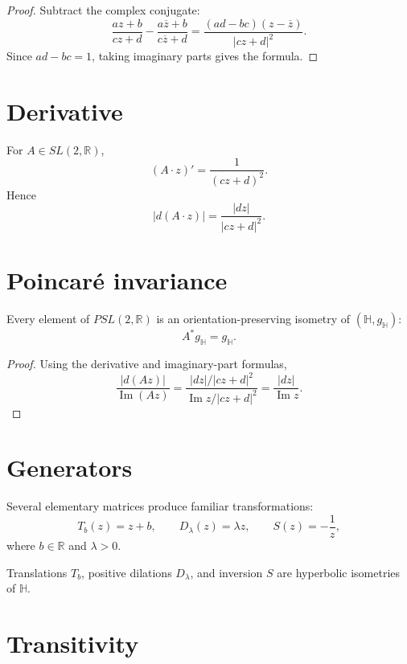 \begin{proof}
Subtract the complex conjugate:
\[
\frac{az+b}{cz+d}
-
\frac{a\overline z+b}{c\overline z+d}
=
\frac{(ad-bc)(z-\overline z)}
{|cz+d|^2}.
\]
Since \(ad-bc=1\), taking imaginary parts gives the formula.
\end{proof}

\section{Derivative}

\begin{proposition}\label{prop:vii33-derivative}
For \(A\in SL(2,\mathbb R)\),
\[
(A\cdot z)'
=
\frac1{(cz+d)^2}.
\]
Hence
\[
|d(A\cdot z)|
=
\frac{|dz|}{|cz+d|^2}.
\]
\end{proposition}

\section{Poincaré invariance}

\begin{theorem}\label{thm:vii33-metric-invariance}
Every element of \(PSL(2,\mathbb R)\) is an orientation-preserving isometry of
\((\mathbb H,g_{\mathbb H})\):
\[
A^*g_{\mathbb H}=g_{\mathbb H}.
\]
\end{theorem}

\begin{proof}
Using the derivative and imaginary-part formulas,
\[
\frac{|d(Az)|}{\operatorname{Im}(Az)}
=
\frac{|dz|/|cz+d|^2}
{\operatorname{Im}z/|cz+d|^2}
=
\frac{|dz|}{\operatorname{Im}z}.
\]
\end{proof}

\section{Generators}

Several elementary matrices produce familiar transformations:
\[
T_b(z)=z+b,
\qquad
D_\lambda(z)=\lambda z,
\qquad
S(z)=-\frac1z,
\]
where \(b\in\mathbb R\) and \(\lambda>0\).

\begin{proposition}\label{prop:vii33-generators}
Translations \(T_b\), positive dilations \(D_\lambda\), and inversion \(S\) are
hyperbolic isometries of \(\mathbb H\).
\end{proposition}

\section{Transitivity}

